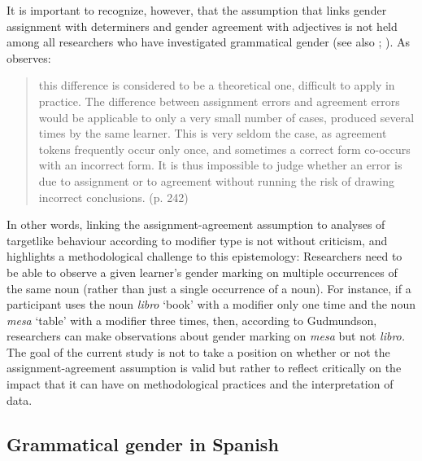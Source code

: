 \documentclass[output=paper,colorlinks,citecolor=brown,modfonts,nonflat]{../langscibook}
\begin{document}
It is important to recognize, however, that the assumption that links gender assignment with determiners and gender agreement with adjectives is not held among all researchers who have investigated grammatical gender (see also \citealt{GaravitoWhite2002}; \citealt[510]{MontrulEtAl2008}). As \citet{Gudmundson2013} observes: 


\begin{quote}
this difference is considered to be a theoretical one, difficult to apply in practice. The difference between assignment errors and agreement errors would be applicable to only a very small number of cases, produced several times by the same learner. This is very seldom the case, as agreement tokens frequently occur only once, and sometimes a correct form co-occurs with an incorrect form. It is thus impossible to judge whether an error is due to assignment or to agreement without running the risk of drawing incorrect conclusions. (p. 242)
\end{quote}

\noindent
In other words, linking the assignment-agreement assumption to analyses of targetlike behaviour according to modifier type is not without criticism, and \citeauthor{Gudmundson2013} highlights a methodological challenge to this epistemology: Researchers need to be able to observe a given learner’s gender marking on multiple occurrences of the same noun (rather than just a single occurrence of a noun). For instance, if a participant uses the noun \textit{libro} ‘book’ with a modifier only one time and the noun \textit{mesa} ‘table’ with a modifier three times, then, according to Gudmundson, researchers can make observations about gender marking on \textit{mesa} but not \textit{libro.} The goal of the current study is not to take a position on whether or not the assignment-agreement assumption is valid but rather to reflect critically on the impact that it can have on methodological practices and the interpretation of data.


\subsection{Grammatical gender in Spanish}\label{sec:gudmestad:2.3}
\end{document}
